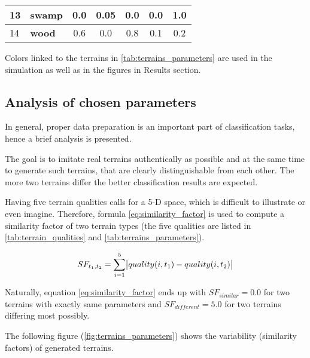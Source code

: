 \begin{table}[H]
\begin{tabular}{|l|l|c|c|c|c|c|}
\cellcolor[HTML]{324B32}13                        & \textbf{swamp}         & 0.0                                     & 0.05                                       & 0.0                                    & 0.0                                      & 1.0                                  \\ \hline
\cellcolor[HTML]{5A4100}14                        & \textbf{wood}          & 0.6                                     & 0.0                                        & 0.8                                    & 0.1                                      & 0.2                                  \\ \hline
\end{tabular}
\end{table}

Colors linked to the terrains in \cref{tab:terrains_parameters} are used in the simulation as well as in the figures in Results section.

\subsection*{Analysis of chosen parameters}
In general, proper data preparation is an important part of classification tasks, hence a brief analysis is presented.

The goal is to imitate real terrains authentically as possible and at the same time to generate such terrains, that are clearly distinguishable from each other. The more two terrains differ the better classification results are expected.

Having five terrain qualities calls for a 5-D space, which is difficult to illustrate or even imagine. Therefore, formula \ref{eq:similarity_factor} is used to compute a similarity factor of two terrain types (the five qualities are listed in \cref{tab:terrain_qualities} and \cref{tab:terrains_parameters}).


\begin{equation} 
\label{eq:similarity_factor}
  SF_{t_1, t_2} = \displaystyle\sum_{i=1}^{5} \abs{quality(i, t_1) - quality(i, t_2)}
\end{equation} 

Naturally, equation \ref{eq:similarity_factor} ends up with $ SF_{similar} = 0.0 $ for two terrains with exactly same parameters and $ SF_{different} = 5.0 $ for two terrains differing most possibly.

The following figure (\ref{fig:terrains_parameters}) shows the variability (similarity factors) of generated terrains.

